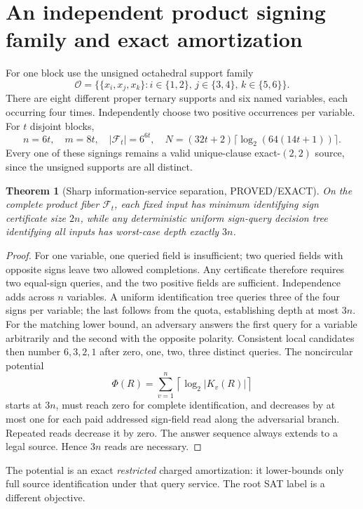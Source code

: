 \documentclass[11pt]{article}
\newtheorem{theorem}{Theorem}
\begin{document}
\section{An independent product signing family and exact amortization}
For one block use the unsigned octahedral support family
\[
\mathcal O=\{\{x_i,x_j,x_k\}:i\in\{1,2\},\,j\in\{3,4\},\,k\in\{5,6\}\}.
\]
There are eight different proper ternary supports and six named variables, each occurring four times. Independently choose two positive occurrences per variable. For $t$ disjoint blocks,
\[
n=6t,\quad m=8t,\quad|\mathcal F_t|=6^{6t},\quad
N=(32t+2)\lceil\log_2(64(14t+1))\rceil.
\]
Every one of these signings remains a valid unique-clause exact-$(2,2)$ source, since the unsigned supports are all distinct.
\begin{theorem}[Sharp information-service separation, PROVED/EXACT]
On the complete product fiber $\mathcal F_t$, each fixed input has minimum identifying sign certificate size $2n$, while any deterministic uniform sign-query decision tree identifying \emph{all} inputs has worst-case depth exactly $3n$.
\end{theorem}
\begin{proof}
For one variable, one queried field is insufficient; two queried fields with opposite signs leave two allowed completions. Any certificate therefore requires two equal-sign queries, and the two positive fields are sufficient. Independence adds across $n$ variables. A uniform identification tree queries three of the four signs per variable; the last follows from the quota, establishing depth at most $3n$.
For the matching lower bound, an adversary answers the first query for a variable arbitrarily and the second with the opposite polarity. Consistent local candidates then number $6,3,2,1$ after zero, one, two, three distinct queries. The noncircular potential
\[
\Phi(R)=\sum_{v=1}^n\left\lceil\log_2|K_v(R)|\right\rceil
\]
starts at $3n$, must reach zero for complete identification, and decreases by at most one for each paid addressed sign-field read along the adversarial branch. Repeated reads decrease it by zero. The answer sequence always extends to a legal source. Hence $3n$ reads are necessary.
\end{proof}
The potential is an exact \emph{restricted} charged amortization: it lower-bounds only full source identification under that query service. The root SAT label is a different objective.
\end{document}
